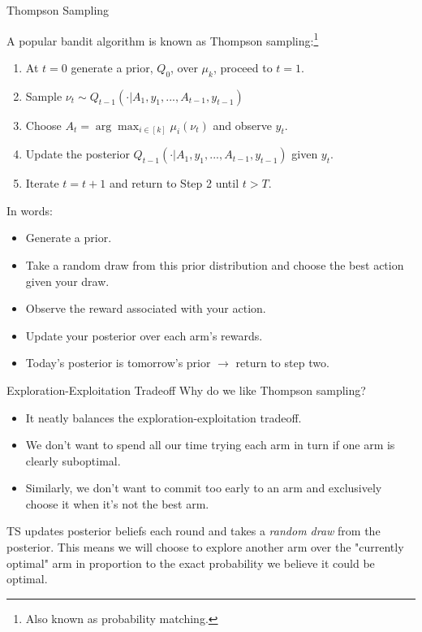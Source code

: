 \documentclass[aspectratio=169,xcolor=dvipsnames]{beamer}
\begin{document}
\begin{frame}{Thompson Sampling}

    A popular bandit algorithm is known as Thompson 
    sampling:\footnote{Also known as probability matching.}
\begin{enumerate}
    \item At $t=0$ generate a prior, $Q_0$, over $\mu_k$, proceed to $t = 1$.
    \item Sample $\nu_t \sim Q_{t-1}(\cdot | A_1, y_1, ..., A_{t-1}, y_{t-1})$
    \item Choose $A_t = \arg\max_{i \in [k]} \mu_i(\nu_t)$ and observe $y_t$.
    \item Update the posterior $Q_{t-1}(\cdot | A_1, y_1, ..., A_{t-1}, y_{t-1})$ given $y_t$.
    \item Iterate $t = t+1$ and return to Step 2 until $t > T$.
\end{enumerate}

\end{frame}


\begin{frame}

    
    In words:

    \begin{itemize}
        \item Generate a prior.
        \item Take a random draw from this prior distribution and choose the best action given your draw.
        \item Observe the reward associated with your action.
        \item Update your posterior over each arm's rewards.
        \item Today's posterior is tomorrow's prior $\rightarrow$ return to step two.
    \end{itemize}

\end{frame}


\begin{frame}{Exploration-Exploitation Tradeoff}
    Why do we like Thompson sampling?

    \begin{itemize}
        \item It neatly balances the exploration-exploitation tradeoff.
        \item We don't want to spend all our time trying each arm in turn if one arm 
        is clearly suboptimal.
        \item Similarly, we don't want to commit too early to an arm and exclusively 
        choose it when it's not the best arm. 
    \end{itemize}

    TS updates posterior beliefs each round and takes a \textit{random draw} from 
    the posterior. This means we will choose to explore another arm over the 
    "currently optimal" arm in proportion to the exact probability we believe it 
    could be optimal.
\end{frame}
\end{document}
